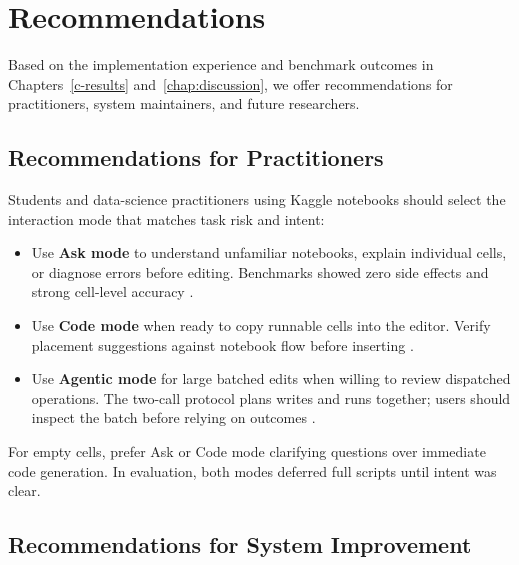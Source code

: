\chapter{Recommendations}
\label{c-recommendation}

Based on the implementation experience and benchmark outcomes in Chapters~\ref{c-results} and~\ref{chap:discussion}, we offer recommendations for practitioners, system maintainers, and future researchers.

\section{Recommendations for Practitioners}

Students and data-science practitioners using Kaggle notebooks should select the interaction mode that matches task risk and intent:

\begin{itemize}
  \item Use \textbf{Ask mode} to understand unfamiliar notebooks, explain individual cells, or diagnose errors before editing. Benchmarks showed zero side effects and strong cell-level accuracy \parencite{vaithilingam2022expectation}.
  \item Use \textbf{Code mode} when ready to copy runnable cells into the editor. Verify placement suggestions against notebook flow before inserting \parencite{mcnutt2023notebookassistants}.
  \item Use \textbf{Agentic mode} for large batched edits when willing to review dispatched operations. The two-call protocol plans writes and runs together; users should inspect the batch before relying on outcomes \parencite{mozannar2024reading}.
\end{itemize}

For empty cells, prefer Ask or Code mode clarifying questions over immediate code generation. In evaluation, both modes deferred full scripts until intent was clear.

\section{Recommendations for System Improvement}


